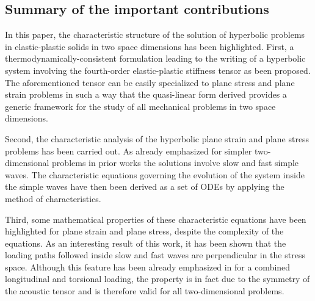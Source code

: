 
\subsection{Summary of the important contributions}
\label{sec:summ-import-results}


In this paper, the characteristic structure of the solution of hyperbolic problems in elastic-plastic solids in two space dimensions has been highlighted.
First, a thermodynamically-consistent formulation leading to the writing of a hyperbolic system involving the fourth-order elastic-plastic stiffness tensor as been proposed.
The aforementioned tensor can be easily specialized to plane stress and plane strain problems in such a way that the quasi-linear form derived provides a generic framework for the study of all mechanical problems in two space dimensions.

Second, the characteristic analysis of the hyperbolic plane strain and plane stress problems has been carried out.
As already emphasized for simpler two-dimensional problems in prior works \cite{Rakhmatulin,CRISTESCU19591605} the solutions involve slow and fast simple waves. 
The characteristic equations governing the evolution of the system inside the simple waves have then been derived as a set of ODEs by applying the method of characteristics.

Third, some mathematical properties of these characteristic equations have been highlighted for plane strain and plane stress, despite the complexity of the equations.
As an interesting result of this work, it has been shown that the loading paths followed inside slow and fast waves are perpendicular in the stress space.
Although this feature has been already emphasized in \cite{Clifton} for a combined longitudinal and torsional loading, the property is in fact due to the symmetry of the acoustic tensor and is therefore valid for all two-dimensional problems.

